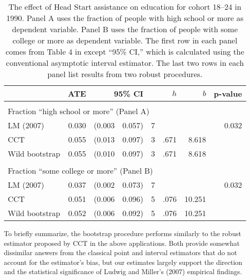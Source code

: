 \documentclass[12pt,fleqn]{article}
\begin{document}
\begin{table}[t]
  \centering
  \begin{tabular}{lrr@{, }rr@{}rrr}
    \toprule
                   & ATE   & \multicolumn{2}{r}{95\% CI} & & $h$     & $b$ & p-value     \\
    \midrule                                                                          \\
    \multicolumn{5}{l}{Fraction ``high school or more'' (Panel A)}                    \\
    \midrule
    LM (2007)      & 0.030 & (0.003                      & 0.057) & 7&     &  & 0.032    \\
    CCT            & 0.055 & (0.013                      & 0.097) & 3&.671 & 8.618       \\
    Wild bootstrap & 0.055 & (0.010                      & 0.097) & 3&.671 & 8.618       \\\\
    \multicolumn{5}{l}{Fraction ``some college or more'' (Panel B)}                   \\
    \midrule
    LM (2007)      & 0.037 & (0.002                      & 0.073) & 7&     &  & 0.032 \T \\
    CCT            & 0.051 & (0.006                      & 0.096) & 5&.076 & 10.251      \\
    Wild bootstrap & 0.052 & (0.006                      & 0.092) & 5&.076 & 10.251      \\
    \bottomrule
  \end{tabular}
  \caption{The effect of Head Start assistance on education for cohort
    18--24 in 1990. Panel A uses the fraction of people with high school
    or more as dependent variable. Panel B uses the fraction of people
    with some college or more as dependent variable. The first row in
    each panel comes from Table 4 in \cite{ludwig2007} except ``95\% CI,''
    which is calculated using the conventional asymptotic interval estimator.
    The last two rows in
    each panel list results from two robust procedures.}
  \label{tbl:3}
\end{table}

To briefly summarize, the bootstrap procedure performs similarly to the robust
estimator proposed by CCT in the above applications. Both provide somewhat
dissimilar answers from the classical point and interval estimators that do
not account for the estimator's bias, but our estimates largely support the
direction and the statistical significance of Ludwig and Miller's (2007)
empirical findings.
\end{document}
